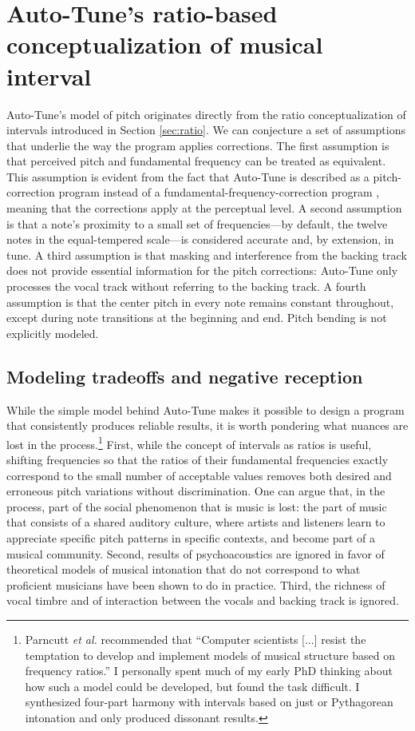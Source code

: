 \section{Auto-Tune's ratio-based conceptualization of musical interval}
\label{sec:interval-conceptualization-design}
Auto-Tune's model of pitch originates directly from the ratio conceptualization of intervals introduced in Section \ref{sec:ratio}. We can conjecture a set of assumptions that underlie the way the program applies corrections. The first assumption is that perceived pitch and fundamental frequency can be treated as equivalent. This assumption is evident from the fact that Auto-Tune is described as a pitch-correction program instead of a fundamental-frequency-correction program \cite{antares:2018}, meaning that the corrections apply at the perceptual level. A second assumption is that a note's proximity to a small set of frequencies---by default, the twelve notes in the equal-tempered scale---is considered accurate and, by extension, in tune. A third assumption is that masking and interference from the backing track does not provide essential information for the pitch corrections: Auto-Tune only processes the vocal track without referring to the backing track. A fourth assumption is that the center pitch in every note remains constant throughout, except during note transitions at the beginning and end. Pitch bending is not explicitly modeled. 

\subsection{Modeling tradeoffs and negative reception}
While the simple model behind Auto-Tune makes it possible to design a program that consistently produces reliable results, it is worth pondering what nuances are lost in the process.\footnote{Parncutt \textit{et al.} recommended that ``Computer scientists [...] resist the temptation to develop and implement models of musical structure based on frequency ratios.'' I personally spent much of my early PhD thinking about how such a model could be developed, but found the task difficult. I synthesized four-part harmony with intervals based on just or Pythagorean intonation and only produced dissonant results.} First, while the concept of intervals as ratios is useful, shifting frequencies so that the ratios of their fundamental frequencies exactly correspond to the small number of acceptable values removes both desired and erroneous pitch variations without discrimination. One can argue that, in the process, part of the social phenomenon that is music is lost: the part of music that consists of a shared auditory culture, where artists and listeners learn to appreciate specific pitch patterns in specific contexts, and become part of a musical community. Second, results of psychoacoustics are ignored in favor of theoretical models of musical intonation that do not correspond to what proficient musicians have been shown to do in practice. Third, the richness of vocal timbre and of interaction between the vocals and backing track is ignored. 

